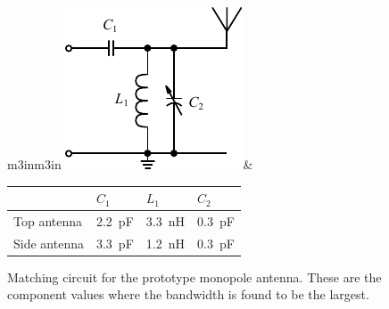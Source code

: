 \begin{figure}[htbp]
        \centering
        \begin{tabular}{m{3in}m{3in}}
            \centering
            \includegraphics{img/tech_sol/schematic_tuning_1}&
            \centering
            \footnotesize
            \begin{tabular}{|l|l|l|l|}
                \hline
                & $C_1$ & $L_1$ & $C_2$ \\
                \hline
                Top antenna & \SI{2.2}{pF} & \SI{3.3}{nH} & \SI{0.3}{pF} \\
                Side antenna & \SI{3.3}{pF} & \SI{1.2}{nH} & \SI{0.3}{pF} \\
                \hline
            \end{tabular}
        \end{tabular}
    \caption{Matching circuit for the prototype monopole antenna. These are the component values where the bandwidth is found to be the largest.}
    \label{fig:mono_proto_meas_matching}
\end{figure}

